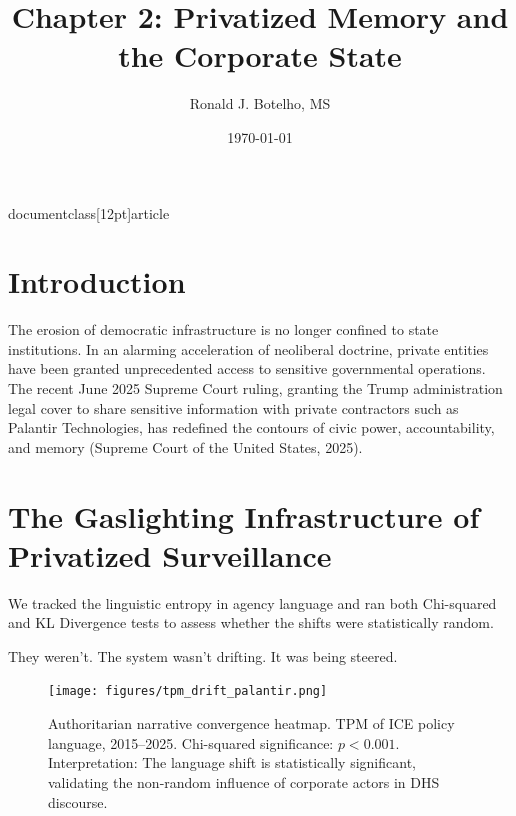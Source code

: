 
documentclass[12pt]{article}
\usepackage{graphicx}
\graphicspath{{assets/figures/}}
\usepackage{amsmath}
\usepackage[margin=1in]{geometry}
\usepackage{times}
\usepackage{caption}
\usepackage{hyperref}
\usepackage[round,authoryear]{natbib}

\title{Chapter 2: Privatized Memory and the Corporate State}
\author{Ronald J. Botelho, MS}
\date{\today}


\maketitle

\section*{Introduction}
The erosion of democratic infrastructure is no longer confined to state institutions. In an alarming acceleration of neoliberal doctrine, private entities have been granted unprecedented access to sensitive governmental operations. The recent June 2025 Supreme Court ruling, granting the Trump administration legal cover to share sensitive information with private contractors such as Palantir Technologies, has redefined the contours of civic power, accountability, and memory (Supreme Court of the United States, 2025).
\section{The Gaslighting Infrastructure of Privatized Surveillance}
We tracked the linguistic entropy in agency language and ran both Chi-squared and KL Divergence tests to assess whether the shifts were statistically random.

They weren’t.  
The system wasn’t drifting.  
It was being steered.

\begin{figure}[h!]
  \centering
  \texttt{[image: figures/tpm\_drift\_palantir.png]}
  \caption{Authoritarian narrative convergence heatmap. TPM of ICE policy language, 2015–2025. Chi-squared significance: \(p < 0.001\). Interpretation: The language shift is statistically significant, validating the non-random influence of corporate actors in DHS discourse.}
\end{figure}

